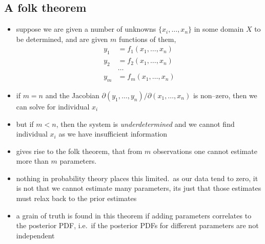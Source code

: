 \documentclass[../jaynes_prob_theory_notes.tex]{subfiles}
\begin{document}
            \subsection{A folk theorem}
                \begin{itemize}
                    \item suppose we are given a number of unknowns $\{x_i, \ldots, x_n\}$ in some domain $X$ to be determined, and are given $m$ functions of them,
                        \begin{align*}
                            y_1 &= f_{1}(x_1, \ldots, x_n) \\
                            y_2 &= f_{2}(x_1, \ldots, x_n) \\
                                &\ldots \\
                            y_m &= f_{m}(x_1, \ldots, x_n)
                        \end{align*}
                    \item if $m=n$ and the Jacobian $\partial (y_1, \ldots, y_n) / \partial (x_1, \ldots, x_n)$ is non--zero, then we can solve for individual $x_i$
                    \item but if $m < n$, then the system is \textit{underdetermined} and we cannot find individual $x_i$ as we have insufficient information
                    \item gives rise to the folk theorem, that from $m$ observations one cannot estimate more than $m$ parameters.
                    \item nothing in probability theory places this limited.\ as our data tend to zero, it is not that we cannot estimate many parameters, its just that those estimates must relax back to the prior estimates
                    \item a grain of truth is found in this theorem if adding parameters correlates to the posterior PDF, i.e.\ if the posterior PDFs for different parameters are not independent
                \end{itemize}
\end{document}

